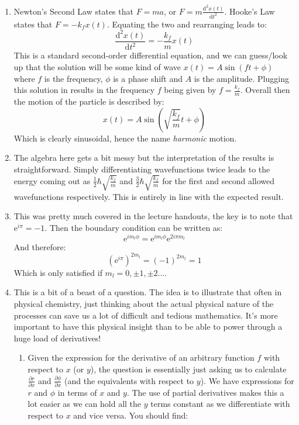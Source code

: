 \documentclass{memoir}[11pt,oneside,a4paper,openany]
\begin{document}
\begin{enumerate}
	\item Newton's Second Law states that $F = ma$, or $F = m\frac{\mathrm{d}^2x(t)}{\mathrm{d}t^2}$. Hooke's Law states that $F = -k_fx(t)$. Equating the two and rearranging leads to:
		\begin{equation}
			\frac{\mathrm{d}^2x(t)}{\mathrm{d}t^2} = -\frac{k_f}{m} x(t)
		\end{equation}
		This is a standard second-order differential equation, and we can guess/look up that the solution will be some kind of wave $x(t) = A\sin(ft+\phi)$ where $f$ is the frequency, $\phi$ is a phase shift and $A$ is the amplitude. Plugging this solution in results in the frequency $f$ being given by $f = \frac{k_f}{m}$. Overall then the motion of the particle is described by:
		\begin{equation}
			x(t) = A\sin(\sqrt{\frac{k_f}{m}}t+\phi)
		\end{equation}
		Which is clearly sinusoidal, hence the name \emph{harmonic} motion.
	\item The algebra here gets a bit messy but the interpretation of the results is straightforward. Simply differentiating wavefunctions twice leads to the energy coming out as $\frac{1}{2}\hbar\sqrt{\frac{k_f}{m}}$ and $\frac{3}{2}\hbar\sqrt{\frac{k_f}{m}}$ for the first and second allowed wavefunctions respectively. This is entirely in line with the expected result.
	\item This was pretty much covered in the lecture handouts, the key is to note that $\mathrm{e}^{i\pi} = -1$. Then the boundary condition can be written as:
		\begin{equation}
			\mathrm{e}^{im_l\phi}=\mathrm{e}^{im_l\phi}\mathrm{e}^{2i\pi m_l}
		\end{equation}
	And therefore:
		\begin{equation}
		(\mathrm{e}^{i\pi})^{2m_l} = (-1)^{2m_l} = 1
		\end{equation}
		Which is only satisfied if $m_l = 0,\pm 1,\pm 2...$.
	\item This is a bit of a beast of a question. The idea is to illustrate that often in physical chemistry, just thinking about the actual physical nature of the processes can save us a lot of difficult and tedious mathematics. It's more important to have this physical insight than to be able to power through a huge load of derivatives!
		\begin{enumerate} 
			\item Given the expression for the derivative of an arbitrary function $f$ with respect to $x$ (or $y$), the question is essentially just asking us to calculate $\frac{\partial r}{\partial x}$ and $\frac{\partial \phi}{\partial x}$ (and the equivalents with respect to $y$). We have expressions for $r$ and $\phi$ in terms of $x$ and $y$. The use of partial derivatives makes this a lot easier as we can hold all the $y$ terms constant as we differentiate with respect to $x$ and vice versa. You should find:

\end{enumerate}
\end{enumerate}
\end{document}
